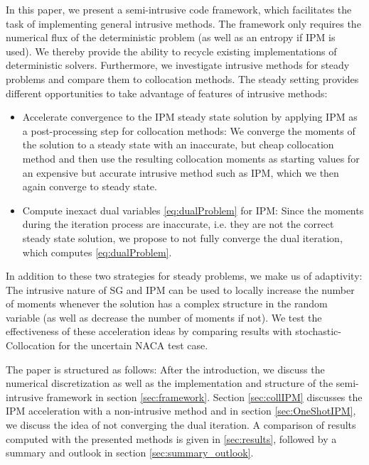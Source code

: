 In this paper, we present a semi-intrusive code framework, which facilitates the task of implementing general intrusive methods. The framework only requires the numerical flux of the deterministic problem (as well as an entropy if IPM is used). We thereby provide the ability to recycle existing implementations of deterministic solvers.
Furthermore, we investigate intrusive methods for steady problems and compare them to collocation methods. The steady setting provides different opportunities to take advantage of features of intrusive methods: 
\begin{itemize}
\item Accelerate convergence to the IPM steady state solution by applying IPM as a post-processing step for collocation methods: We converge the moments of the solution to a steady state with an inaccurate, but cheap collocation method and then use the resulting collocation moments as starting values for an expensive but accurate intrusive method such as IPM, which we then again converge to steady state. 
\item Compute inexact dual variables \eqref{eq:dualProblem} for IPM: Since the moments during the iteration process are inaccurate, i.e. they are not the correct steady state solution, we propose to not fully converge the dual iteration, which computes \eqref{eq:dualProblem}. 
\end{itemize}
In addition to these two strategies for steady problems, we make us of adaptivity: The intrusive nature of SG and IPM can be used to locally increase the number of moments whenever the solution has a complex structure in the random variable (as well as decrease the number of moments if not). We test the effectiveness of these acceleration ideas by comparing results with stochastic-Collocation for the uncertain NACA test case. 

The paper is structured as follows: After the introduction, we discuss the numerical discretization as well as the implementation and structure of the semi-intrusive framework in section \ref{sec:framework}. Section \ref{sec:collIPM} discusses the IPM acceleration with a non-intrusive method and in section \ref{sec:OneShotIPM}, we discuss the idea of not converging the dual iteration. A comparison of results computed with the presented methods is given in \ref{sec:results}, followed by a summary and outlook in section \ref{sec:summary_outlook}.

